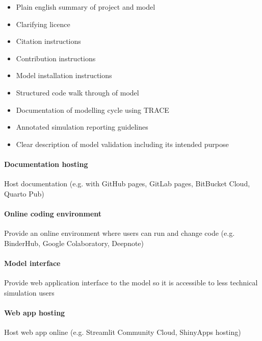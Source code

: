 \documentclass[
]{article}
\providecommand{\tightlist}{%
  \setlength{\itemsep}{0pt}\setlength{\parskip}{0pt}}
\begin{document}
\begin{itemize}
\tightlist
\item
  Plain english summary of project and model
\item
  Clarifying licence
\item
  Citation instructions
\item
  Contribution instructions
\item
  Model installation instructions
\item
  Structured code walk through of model
\item
  Documentation of modelling cycle using TRACE
\item
  Annotated simulation reporting guidelines
\item
  Clear description of model validation including its intended purpose
\end{itemize}

\paragraph{Documentation hosting}

Host documentation (e.g. with GitHub pages, GitLab pages, BitBucket
Cloud, Quarto Pub)

\paragraph{Online coding environment}

Provide an online environment where users can run and change code (e.g.
BinderHub, Google Colaboratory, Deepnote)

\paragraph{Model interface}

Provide web application interface to the model so it is accessible to
less technical simulation users

\paragraph{Web app hosting}

Host web app online (e.g. Streamlit Community Cloud, ShinyApps hosting)
\end{document}
